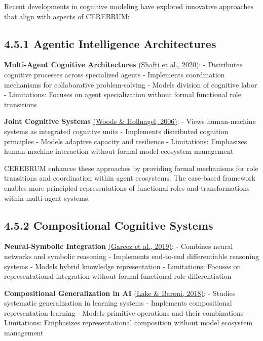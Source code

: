 \documentclass[
  11pt,
  letterpaper,
]{article}
\begin{document}
Recent developments in cognitive modeling have explored innovative
approaches that align with aspects of CEREBRUM:

\hypertarget{agentic-intelligence-architectures}{%
\subsection{4.5.1 Agentic Intelligence
Architectures}\label{agentic-intelligence-architectures}}

\textbf{Multi-Agent Cognitive Architectures}
\protect\hyperlink{references}{(Shafti et al., 2020)}: - Distributes
cognitive processes across specialized agents - Implements coordination
mechanisms for collaborative problem-solving - Models division of
cognitive labor - Limitations: Focuses on agent specialization without
formal functional role transitions

\textbf{Joint Cognitive Systems} \protect\hyperlink{references}{(Woods
\& Hollnagel, 2006)}: - Views human-machine systems as integrated
cognitive units - Implements distributed cognition principles - Models
adaptive capacity and resilience - Limitations: Emphasizes human-machine
interaction without formal model ecosystem management

CEREBRUM enhances these approaches by providing formal mechanisms for
role transitions and coordination within agent ecosystems. The
case-based framework enables more principled representations of
functional roles and transformations within multi-agent systems.

\hypertarget{compositional-cognitive-systems}{%
\subsection{4.5.2 Compositional Cognitive
Systems}\label{compositional-cognitive-systems}}

\textbf{Neural-Symbolic Integration}
\protect\hyperlink{references}{(Garcez et al., 2019)}: - Combines neural
networks and symbolic reasoning - Implements end-to-end differentiable
reasoning systems - Models hybrid knowledge representation -
Limitations: Focuses on representational integration without formal
functional role differentiation

\textbf{Compositional Generalization in AI}
\protect\hyperlink{references}{(Lake \& Baroni, 2018)}: - Studies
systematic generalization in learning systems - Implements compositional
representation learning - Models primitive operations and their
combinations - Limitations: Emphasizes representational composition
without model ecosystem management
\end{document}
